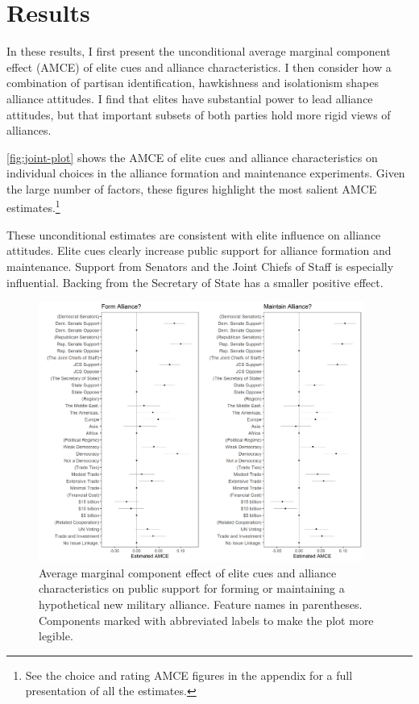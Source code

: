 \documentclass[12pt]{article}
\begin{document}
\section{Results} 


In these results, I first present the unconditional average marginal component effect (AMCE) of elite cues and alliance characteristics.
I then consider how a combination of partisan identification, hawkishness and isolationism shapes alliance attitudes. 
I find that elites have substantial power to lead alliance attitudes, but that important subsets of both parties hold more rigid views of alliances. 


\autoref{fig:joint-plot} shows the AMCE of elite cues and alliance characteristics on individual choices in the alliance formation and maintenance experiments.
Given the large number of factors, these figures highlight the most salient AMCE estimates.\footnote{See the choice and rating AMCE figures in the appendix for a full presentation of all the estimates.}


These unconditional estimates are consistent with elite influence on alliance attitudes. 
Elite cues clearly increase public support for alliance formation and maintenance. 
Support from Senators and the Joint Chiefs of Staff is especially influential.
Backing from the Secretary of State has a smaller positive effect. 


\begin{figure}
	\centering
		\includegraphics[width=0.95\textwidth]{../figures/joint-amce-plots.png}
	\caption{Average marginal component effect of elite cues and alliance characteristics on public support for forming or maintaining a hypothetical new military alliance. Feature names in parentheses. Components marked with abbreviated labels to make the plot more legible.}
	\label{fig:joint-plot}
\end{figure}
\end{document}
